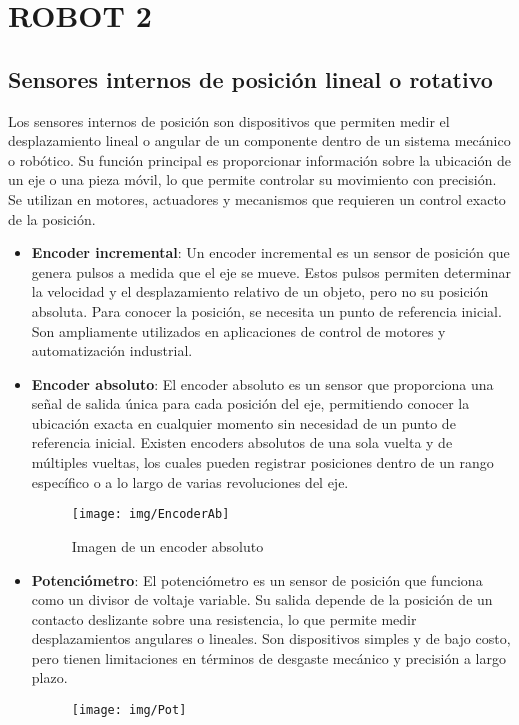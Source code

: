 \section{ROBOT 2}
\subsection{Sensores internos de posición lineal o rotativo}
Los sensores internos de posición son dispositivos que permiten medir el desplazamiento lineal o angular de un componente dentro de un sistema mecánico o robótico. Su función principal es proporcionar información sobre la ubicación de un eje o una pieza móvil, lo que permite controlar su movimiento con precisión. Se utilizan en motores, actuadores y mecanismos que requieren un control exacto de la posición.

\begin{itemize}
\item \textbf{Encoder incremental}: Un encoder incremental es un sensor de posición que genera pulsos a medida que el eje se mueve. Estos pulsos permiten determinar la velocidad y el desplazamiento relativo de un objeto, pero no su posición absoluta. Para conocer la posición, se necesita un punto de referencia inicial. Son ampliamente utilizados en aplicaciones de control de motores y automatización industrial.
\item \textbf{Encoder absoluto}: El encoder absoluto es un sensor que proporciona una señal de salida única para cada posición del eje, permitiendo conocer la ubicación exacta en cualquier momento sin necesidad de un punto de referencia inicial. Existen encoders absolutos de una sola vuelta y de múltiples vueltas, los cuales pueden registrar posiciones dentro de un rango específico o a lo largo de varias revoluciones del eje.
\begin{figure}[h]
	\centering
	\texttt{[image: img/EncoderAb]}
	\caption{Imagen de un encoder absoluto}
	\label{fig:EncoderAb}
\end{figure}
\item \textbf{Potenciómetro}: El potenciómetro es un sensor de posición que funciona como un divisor de voltaje variable. Su salida depende de la posición de un contacto deslizante sobre una resistencia, lo que permite medir desplazamientos angulares o lineales. Son dispositivos simples y de bajo costo, pero tienen limitaciones en términos de desgaste mecánico y precisión a largo plazo.
\begin{figure}[h]
	\centering
	\texttt{[image: img/Pot]}

\end{figure}
\end{itemize}
